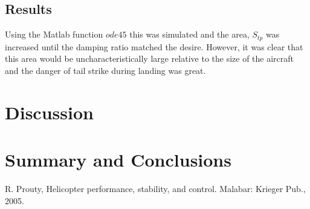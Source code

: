 \documentclass[11pt,a4paper]{article}
\begin{document}
\subsection{Results}
Using the Matlab function $ode45$ this was simulated and the area, $S_{tp}$ was increased until the damping ratio matched the desire. However, it was clear that this area would be uncharacteristically large relative to the size of the aircraft and the danger of tail strike during landing was great. 









\section{Discussion}

\section{Summary and Conclusions}


\begin{thebibliography}{}
R. Prouty, Helicopter performance, stability, and control. Malabar: Krieger Pub., 2005.

\end{thebibliography}{}
\end{document}

